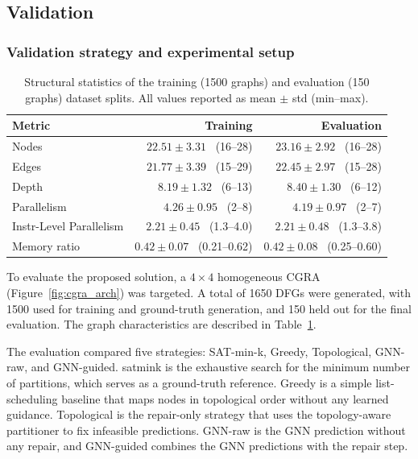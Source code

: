 \subsection{Validation}

\subsubsection{Validation strategy and experimental setup}

\begin{table}[!t]
\footnotesize
\centering
\caption{Structural statistics of the training (1500 graphs) and evaluation 
(150 graphs) dataset splits. All values reported as mean $\pm$ std 
(min--max).}
\label{tab:dataset_stats}
\setlength{\tabcolsep}{4pt}
\begin{tabular}{lrr}
\textbf{Metric} & \textbf{Training} & \textbf{Evaluation} \\
\midrule
Nodes           & $22.51 \pm 3.31$ \ (16--28) & $23.16 \pm 2.92$ \ (16--28) \\
Edges           & $21.77 \pm 3.39$ \ (15--29) & $22.45 \pm 2.97$ \ (15--28) \\
Depth           & $8.19 \pm 1.32$ \ (6--13)   & $8.40 \pm 1.30$ \ (6--12)   \\
Parallelism     & $4.26 \pm 0.95$ \ (2--8)    & $4.19 \pm 0.97$ \ (2--7)    \\
Instr-Level Parallelism             & $2.21 \pm 0.45$ \ (1.3--4.0) & $2.21 \pm 0.48$ \ (1.3--3.8) \\
Memory ratio    & $0.42 \pm 0.07$ \ (0.21--0.62) & $0.42 \pm 0.08$ \ (0.25--0.60) \\
\bottomrule
\end{tabular}
\end{table}


To evaluate the proposed solution, a $4\times4$ homogeneous CGRA (Figure~\ref{fig:cgra_arch}) was targeted. A total of 1650 DFGs were generated, with 1500 used for training and ground-truth generation, and 150 held out for the final evaluation. The graph characteristics are described in Table~\ref{tab:dataset_stats}.

The evaluation compared five strategies: SAT-min-k, Greedy, Topological, GNN-raw, and GNN-guided. 
\gls{satmink} is the exhaustive search for the minimum number of partitions, which serves as a ground-truth reference. Greedy is a simple list-scheduling baseline that maps nodes in topological order without any learned guidance. Topological is the repair-only strategy that uses the topology-aware partitioner to fix infeasible predictions. GNN-raw is the GNN prediction without any repair, and GNN-guided combines the GNN predictions with the repair step.

